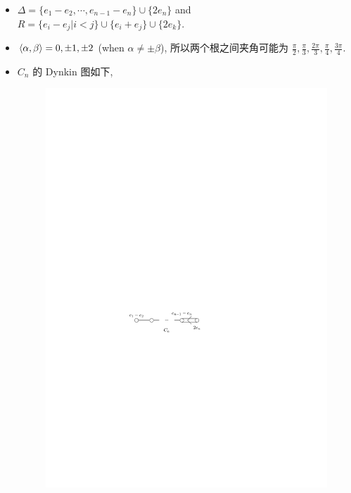 \begin{itemize}
\begin{itemize}
		\item $\Delta = \{e_1 - e_2, \cdots, e_{n - 1} - e_n\} \cup \{2 e_n\}$ and $R = \{e_i - e_j | i < j\} \cup \{e_i + e_j\} \cup \{2 e_k\}$.
		
		\item $\braket{\alpha, \beta} = 0, \pm 1, \pm 2$ (when $\alpha \neq \pm \beta$), 所以两个根之间夹角可能为 $\frac{\pi}{2}, \frac{\pi}{3}, \frac{2 \pi}{3}, \frac{\pi}{4}, \frac{3 \pi}{4}$.
		
		\item $C_n$ 的 Dynkin 图如下,
		
		\begin{figure}[H]
			\centering
			\includegraphics[scale=1]{figures/Dynkin diagram for Cn.pdf}
		\end{figure}
	\end{itemize}
\end{itemize}
